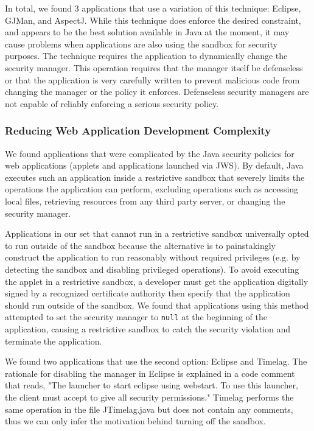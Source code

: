 \documentclass{sig-alternate}
\begin{document}
In total, we found 3 applications that use a variation of this technique:
Eclipse, GJMan, and AspectJ. While this technique does enforce the
desired constraint, and appears to be the best solution available
in Java at the moment, it may cause problems when applications are
also using the sandbox for security purposes. The technique requires
the application to dynamically change the security manager. This operation
requires that the manager itself be defenseless or that the application
is very carefully written to prevent malicious code from changing
the manager or the policy it enforces. Defenseless security managers
are not capable of reliably enforcing a serious security policy.

\subsubsection{Reducing Web Application Development Complexity}\label{sub:Reducing-Web-Application-Complexity}

We found applications that were complicated by the Java security policies
for web applications (applets and applications launched via JWS). By default, Java executes such an application inside a restrictive
sandbox that severely limits the operations the application can perform,
excluding operations such as accessing local files, retrieving resources
from any third party server, or changing the security manager. 

Applications in our set that cannot run in a restrictive sandbox universally opted to run outside of the sandbox because the alternative is to painstakingly construct the application to run reasonably without required privileges (e.g. by detecting the sandbox and disabling privileged operations). To avoid executing the applet in a restrictive
sandbox, a developer must get the application digitally signed
by a recognized certificate authority then specify that the application should
run outside of the sandbox. We found that applications using this method attempted
to set the security manager to \texttt{null} at the beginning of the
application, causing a restrictive sandbox to catch the security violation and
terminate the application. 

We found two applications that use the second option: Eclipse and
Timelag. The rationale for disabling the manager in Eclipse is explained in a code comment that reads, "The launcher to start eclipse using webstart. To use this launcher, the client must accept to give all security permissions." Timelag performs the same operation in the file JTimelag.java but does not contain any comments, thus we can only infer the motivation behind turning off the sandbox.
\end{document}
